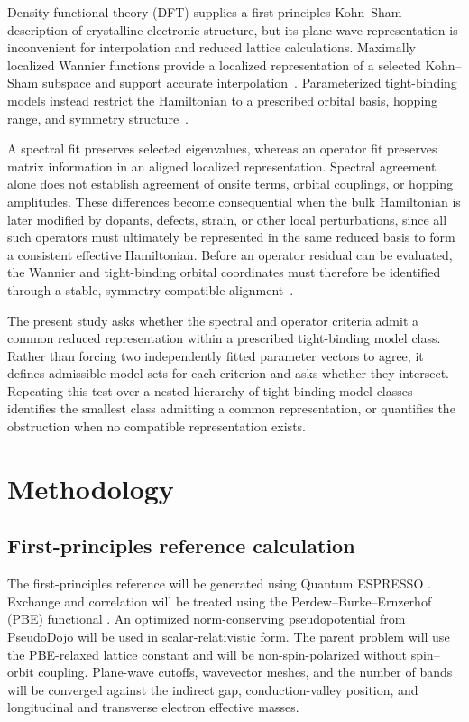 \documentclass[preprint,12pt]{elsarticle}
\begin{document}
Density-functional theory (DFT) supplies a first-principles Kohn--Sham
description of crystalline electronic structure, but its plane-wave
representation is inconvenient for interpolation and reduced lattice
calculations. Maximally localized Wannier functions provide a localized
representation of a selected Kohn--Sham subspace and support accurate
interpolation~\cite{marzari2012,pizzi2020,souza2001,yates2007}. Parameterized
tight-binding models instead restrict the Hamiltonian to a prescribed orbital
basis, hopping range, and symmetry structure~\cite{slater1954,vogl1983}.

A spectral fit preserves selected eigenvalues, whereas an operator fit
preserves matrix information in an aligned localized representation. Spectral
agreement alone does not establish agreement of onsite terms, orbital
couplings, or hopping amplitudes. These differences become consequential when
the bulk Hamiltonian is later modified by dopants, defects, strain, or other
local perturbations, since all such operators must ultimately be represented
in the same reduced basis to form a consistent effective Hamiltonian. Before
an operator residual can be evaluated, the Wannier and tight-binding orbital
coordinates must therefore be identified through a stable, symmetry-compatible
alignment~\cite{bjork1973,higham1986}.

The present study asks whether the spectral and operator criteria admit a
common reduced representation within a prescribed tight-binding model class.
Rather than forcing two independently fitted parameter vectors to agree, it
defines admissible model sets for each criterion and asks whether they
intersect. Repeating this test over a nested hierarchy of tight-binding model
classes identifies the smallest class admitting a common representation, or
quantifies the obstruction when no compatible representation exists.

\section{Methodology}
\label{sec:methodology}

\subsection{First-principles reference calculation}
\label{sec:dft-reference}

\begin{sloppypar}
The first-principles reference will be generated using Quantum
ESPRESSO \cite{giannozzi2009}. Exchange and correlation will be treated using
the Perdew--Burke--Ernzerhof (PBE) functional \cite{perdew1996}.
An optimized norm-conserving pseudopotential from PseudoDojo
\cite{hamann2013,vansetten2018} will be used in scalar-relativistic form. The
parent problem will use the PBE-relaxed lattice constant and will be
non-spin-polarized without spin--orbit coupling. Plane-wave cutoffs, wavevector
meshes, and the number of bands will be converged against the indirect gap,
conduction-valley position, and longitudinal and transverse electron effective
masses.
\end{sloppypar}
\end{document}
